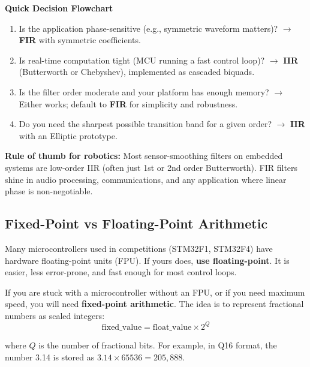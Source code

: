 \vspace{0.5em}
\begin{mdframed}[linewidth=1pt, innertopmargin=10pt, innerbottommargin=10pt]
\textbf{Quick Decision Flowchart}

\vspace{0.3em}
\begin{enumerate}[nosep]
    \item Is the application phase-sensitive (e.g., symmetric waveform matters)?
          $\rightarrow$ \textbf{FIR} with symmetric coefficients.
    \item Is real-time computation tight (MCU running a fast control loop)?
          $\rightarrow$ \textbf{IIR} (Butterworth or Chebyshev), implemented as
          cascaded biquads.
    \item Is the filter order moderate and your platform has enough memory?
          $\rightarrow$ Either works; default to \textbf{FIR} for simplicity and
          robustness.
    \item Do you need the sharpest possible transition band for a given order?
          $\rightarrow$ \textbf{IIR} with an Elliptic prototype.
\end{enumerate}

\textbf{Rule of thumb for robotics:} Most sensor-smoothing filters on embedded
systems are low-order IIR (often just 1st or 2nd order Butterworth). FIR filters
shine in audio processing, communications, and any application where linear phase
is non-negotiable.
\end{mdframed}

\subsection{Fixed-Point vs Floating-Point Arithmetic}

Many microcontrollers used in competitions (STM32F1, STM32F4) have hardware floating-point units (FPU). If yours does, \textbf{use floating-point}. It is easier, less error-prone, and fast enough for most control loops.

If you are stuck with a microcontroller without an FPU, or if you need maximum speed, you will need \textbf{fixed-point arithmetic}. The idea is to represent fractional numbers as scaled integers:
\begin{equation}
\text{fixed\_value} = \text{float\_value} \times 2^Q
\end{equation}

where $Q$ is the number of fractional bits. For example, in Q16 format, the number 3.14 is stored as $3.14 \times 65536 = 205,888$.

